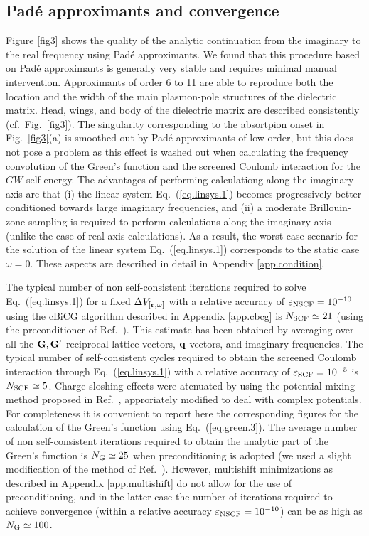 \documentclass[twocolumn,prb,showpacs,superscriptaddress]{revtex4}
\def\w{\omega}
\def\q{{\bf q}}
\def\G{{\bf G}}
\def\Gp{{\bf G^\prime}}
\def\r{{\bf r}}
\begin{document}
\subsection{Pad\'e approximants and convergence}

Figure \ref{fig3} shows the quality of the analytic continuation from the imaginary to
the real frequency using Pad\'e approximants. We found that this procedure based on 
Pad\'e approximants is generally very stable and requires minimal manual intervention.
Approximants of order 6 to 11 are able to reproduce both the location and the width of
the main plasmon-pole structures of the dielectric matrix. Head, wings, and body of the
dielectric matrix are described consistently (cf.\ Fig.\ \ref{fig3}). The singularity
corresponding to the absortpion onset in Fig.\ \ref{fig3}(a) is smoothed out by 
Pad\'e approximants of low order, but this does not pose a problem as this effect
is washed out when calculating the frequency convolution of the Green's function and 
the screened Coulomb interaction for the $GW$ self-energy.
The advantages of performing calculationg along the imaginary axis are that (i) the 
linear system Eq.\ (\ref{eq.linsys.1}) becomes progressively better conditioned
towards large imaginary frequencies, and (ii) a moderate Brillouin-zone sampling is
required to perform calculations along the imaginary axis (unlike the case of real-axis
calculations). As a result, the worst case scenario for the solution
of the linear system Eq.\ (\ref{eq.linsys.1}) corresponds to the static case $\w=0$.
These aspects are described in detail in Appendix \ref{app.condition}.

The typical number of non self-consistent iterations required to solve Eq.\ (\ref{eq.linsys.1})
for a fixed $\Delta V_{[\r,\w]}$ with a relative accuracy of $\varepsilon_{\rm NSCF}=10^{-10}$
using the cBiCG algorithm described in Appendix \ref{app.cbcg} is $N_{\rm SCF}\simeq 21$
(using the preconditioner of Ref.\ ). This estimate has been obtained by averaging
over all the $\G,\Gp$ reciprocal lattice vectors, $\q$-vectors, and imaginary frequencies.
The typical number of self-consistent cycles required to obtain the screened Coulomb
interaction through Eq.\ (\ref{eq.linsys.1}) with a relative accuracy of $\varepsilon_{\rm SCF}=10^{-5}$ 
is $N_{\rm SCF}\simeq 5$.
%
%
Charge-sloshing effects were atenuated by using the potential mixing method proposed in
 Ref.\ , approriately modified to deal with complex potentials. 
For completeness it is convenient to report here the corresponding figures for
the calculation of the Green's function using Eq.\ (\ref{eq.green.3}). The average number
of non self-consistent iterations required to obtain the analytic part of the Green's
function is $N_{\rm G}\simeq 25$ when preconditioning is adopted (we used a slight modification
of the method of Ref.\ ). However, multishift minimizations as
described in Appendix \ref{app.multishift} do not allow for the use of preconditioning, and in the
latter case the number of iterations required to achieve convergence (within a relative
accuracy $\varepsilon_{\rm NSCF}=10^{-10}$) can be as high as $N_{\rm G}\simeq 100$. 
\end{document}
